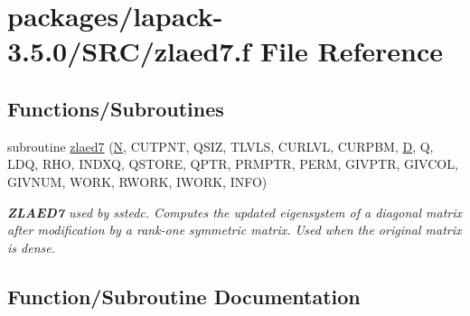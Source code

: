 \hypertarget{zlaed7_8f}{}\section{packages/lapack-\/3.5.0/\+S\+R\+C/zlaed7.f File Reference}
\label{zlaed7_8f}
\subsection*{Functions/\+Subroutines}
\begin{DoxyCompactItemize}
\item 
subroutine \hyperlink{zlaed7_8f_af2b7638f38390f8b86593a166593fc9d}{zlaed7} (\hyperlink{polmisc_8c_a0240ac851181b84ac374872dc5434ee4}{N}, C\+U\+T\+P\+N\+T, Q\+S\+I\+Z, T\+L\+V\+L\+S, C\+U\+R\+L\+V\+L, C\+U\+R\+P\+B\+M, \hyperlink{odrpack_8h_a7dae6ea403d00f3687f24a874e67d139}{D}, Q, L\+D\+Q, R\+H\+O, I\+N\+D\+X\+Q, Q\+S\+T\+O\+R\+E, Q\+P\+T\+R, P\+R\+M\+P\+T\+R, P\+E\+R\+M, G\+I\+V\+P\+T\+R, G\+I\+V\+C\+O\+L, G\+I\+V\+N\+U\+M, W\+O\+R\+K, R\+W\+O\+R\+K, I\+W\+O\+R\+K, I\+N\+F\+O)
\begin{DoxyCompactList}\small\item\em {\bfseries Z\+L\+A\+E\+D7} used by sstedc. Computes the updated eigensystem of a diagonal matrix after modification by a rank-\/one symmetric matrix. Used when the original matrix is dense. \end{DoxyCompactList}\end{DoxyCompactItemize}


\subsection{Function/\+Subroutine Documentation}
\hypertarget{zlaed7_8f_af2b7638f38390f8b86593a166593fc9d}{}
